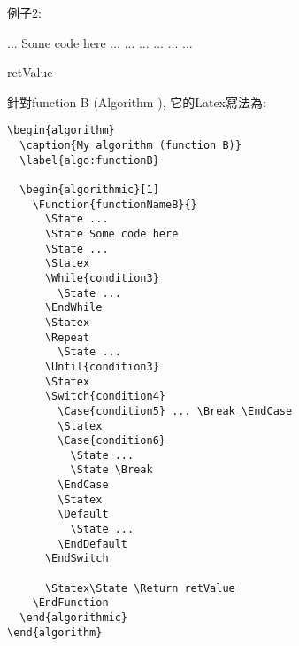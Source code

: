 
\newpage
例子2:
\begin{algorithm}
  \caption{My algorithm (function B)}
  \label{algo:functionB}

  \begin{algorithmic}[1]
      \State ...
      \State Some code here
      \State ...
      \Statex
        \State ...
      \EndWhile
      \Statex
      \Repeat
        \State ...
      \Statex
         ... \Break \EndCase
        \Statex
          \State ...
          \State \Break
        \EndCase
        \Statex
        \Default
          \State ...
        \EndDefault
      \EndSwitch

      \Statex\State \Return retValue
    \EndFunction
  \end{algorithmic}
\end{algorithm}

\newpage
針對function B (Algorithm ), 它的Latex寫法為:
    \EmptyLine
\begin{fmpage}{\textwidth}
  \begin{verbatim}
\begin{algorithm}
  \caption{My algorithm (function B)}
  \label{algo:functionB}

  \begin{algorithmic}[1]
    \Function{functionNameB}{}
      \State ...
      \State Some code here
      \State ...
      \Statex
      \While{condition3}
        \State ...
      \EndWhile
      \Statex
      \Repeat
        \State ...
      \Until{condition3}
      \Statex
      \Switch{condition4}
        \Case{condition5} ... \Break \EndCase
        \Statex
        \Case{condition6}
          \State ...
          \State \Break
        \EndCase
        \Statex
        \Default
          \State ...
        \EndDefault
      \EndSwitch

      \Statex\State \Return retValue
    \EndFunction
  \end{algorithmic}
\end{algorithm}
  \end{verbatim}
\end{fmpage}
